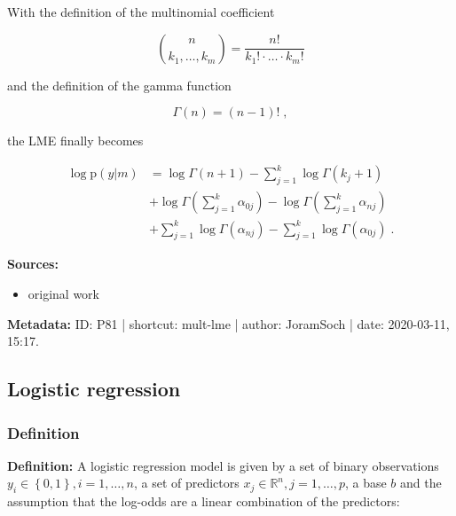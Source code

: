 \documentclass[a4paper,12pt,twoside]{book}
\begin{document}
With the definition of the multinomial coefficient

\begin{equation} \label{eq:mult-lme-mult-coeff}
{n \choose {k_1, \ldots, k_m}} = \frac{n!}{k_1! \cdot \ldots \cdot k_m!}
\end{equation}

and the definition of the gamma function

\begin{equation} \label{eq:mult-lme-gam-fct}
\Gamma(n) = (n-1)! \; ,
\end{equation}

the LME finally becomes

\begin{equation} \label{eq:mult-lme-Mult-LME-s2}
\begin{split}
\log \mathrm{p}(y|m) &= \log \Gamma(n+1) - \sum_{j=1}^{k} \log \Gamma(k_j+1) \\
&+ \log \Gamma \left( \sum_{j=1}^{k} \alpha_{0j} \right) - \log \Gamma \left( \sum_{j=1}^{k} \alpha_{nj} \right) \\
&+ \sum_{j=1}^k \log \Gamma(\alpha_{nj}) - \sum_{j=1}^k \log \Gamma(\alpha_{0j}) \; .
\end{split}
\end{equation}


\vspace{1em}
\textbf{Sources:}
\begin{itemize}
\item original work\end{itemize}


\vspace{1em}
\textbf{Metadata:} ID: P81 | shortcut: mult-lme | author: JoramSoch | date: 2020-03-11, 15:17.
\vspace{1em}



\subsection{Logistic regression}

\subsubsection[\textit{Definition}]{Definition} \label{sec:logreg}
\setcounter{equation}{0}

\textbf{Definition:} A logistic regression model is given by a set of binary observations $y_i \in \left\lbrace 0, 1 \right\rbrace, i = 1,\ldots,n$, a set of predictors $x_j \in \mathbb{R}^n, j = 1,\ldots,p$, a base $b$ and the assumption that the log-odds are a linear combination of the predictors:
\end{document}

